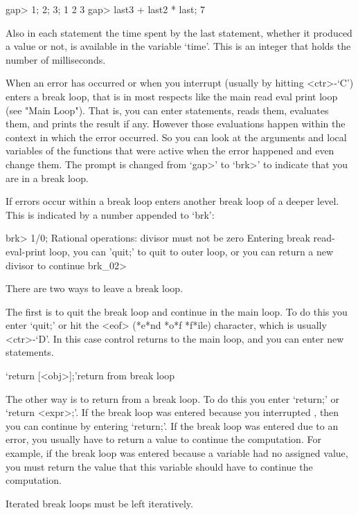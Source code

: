 \beginexample
gap> 1; 2; 3;
1
2
3
gap> last3 + last2 * last;
7 
\endexample

Also in each statement the time spent by the last statement, whether it
produced a value or not, is available in the variable `time'. This is an
integer that holds the number of milliseconds.


When an error has occurred or when you interrupt {\GAP} (usually by
hitting <ctr>-`C') {\GAP} enters a break loop, that is in most respects
like the main read eval print loop (see "Main Loop"). That is, you can
enter statements, {\GAP} reads them, evaluates them, and prints the
result if any. However those evaluations happen within the context in
which the error occurred. So you can look at the arguments and local
variables of the functions that were active when the error happened and
even change them. The prompt is changed from `gap>' to `brk>' to
indicate that you are in a break loop.

If errors occur within a break loop {\GAP} enters another break loop of a
deeper level. This is indicated by a number appended to `brk':

\begintt
brk> 1/0;
Rational operations: divisor must not be zero
Entering break read-eval-print loop, you can 'quit;' to quit to outer loop,
or you can return a new divisor to continue
brk_02> 
\endtt

There are two ways to leave a break loop.

The first is to quit the break loop and continue in the main loop. To do
this you enter `quit;' or hit the <eof> (*e*nd *o*f *f*ile) character,
which is usually <ctr>-`D'. In this case control returns to the main
loop, and you can enter new statements.

\>`return [<obj>];'{return from break loop}

The other way is to return from a break loop. To do this you enter
`return;' or `return <expr>;'. If the break loop was entered because you
interrupted {\GAP}, then you can continue by entering `return;'. If the
break loop was entered due to an error, you usually have to return a
value to continue the computation. For example, if the break loop was
entered because a variable had no assigned value, you must return the
value that this variable should have to continue the computation.

Iterated break loops must be left iteratively.

